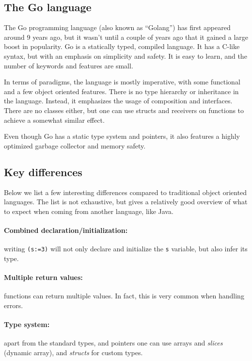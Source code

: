 \subsection{The Go language}
The Go programming language (also known as ``Golang'') has first appeared around 9 years ago, but it wasn't until a couple of years ago that it gained a large boost in popularity. Go is a statically typed, compiled language. It has a C-like syntax, but with an emphasis on simplicity and safety\cite{wiki08}. It is easy to learn, and the number of keywords and features are small.

In terms of paradigms, the language is mostly imperative, with some functional and a few object oriented features. There is no type hierarchy or inheritance in the language. Instead, it emphasizes the usage of composition and interfaces. There are no classes either, but one can use structs and receivers on functions to achieve a somewhat similar effect.

Even though Go has a static type system and pointers, it also features a highly optimized garbage collector and memory safety.

\subsection{Key differences}

Below we list a few interesting differences compared to traditional object oriented languages. The list is not exhaustive, but gives a relatively good overview of what to expect when coming from another language, like Java.

\paragraph{Combined declaration/initialization:} writing \texttt{(s:=3)} will not only declare and initialize the \texttt{s} variable, but also infer its type.

\paragraph{Multiple return values:} functions can return multiple values. In fact, this is very common when handling errors.

\paragraph{Type system:} apart from the standard types, and pointers one can use arrays and \textit{slices} (dynamic array), and \textit{structs} for custom types.

